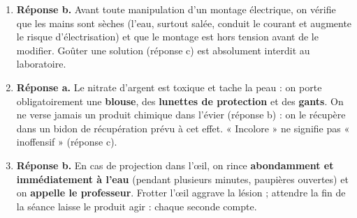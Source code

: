 \documentclass[11pt]{article}
\begin{document}
\begin{corrige}
\begin{enumerate}
\item \textbf{Réponse b.} Avant toute manipulation d'un montage électrique, on vérifie que les mains sont sèches (l'eau, surtout salée, conduit le courant et augmente le risque d'électrisation) et que le montage est hors tension avant de le modifier. Goûter une solution (réponse c) est absolument interdit au laboratoire.
\item \textbf{Réponse a.} Le nitrate d'argent est toxique et tache la peau : on porte obligatoirement une \textbf{blouse}, des \textbf{lunettes de protection} et des \textbf{gants}. On ne verse jamais un produit chimique dans l'évier (réponse b) : on le récupère dans un bidon de récupération prévu à cet effet. « Incolore » ne signifie pas « inoffensif » (réponse c).
\item \textbf{Réponse b.} En cas de projection dans l'œil, on rince \textbf{abondamment et immédiatement à l'eau} (pendant plusieurs minutes, paupières ouvertes) et on \textbf{appelle le professeur}. Frotter l'œil aggrave la lésion ; attendre la fin de la séance laisse le produit agir : chaque seconde compte.
\end{enumerate}
\end{corrige}
\end{document}
